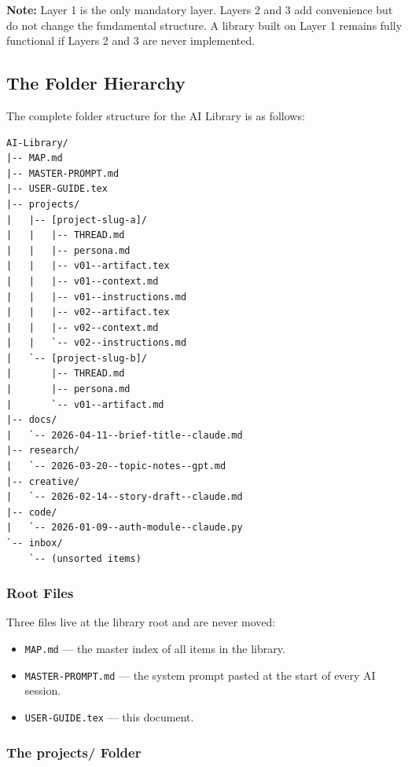 \documentclass[12pt,letterpaper]{article}
\begin{document}
\begin{mdframed}[style=notebox]
\textbf{Note:} Layer 1 is the only mandatory layer. Layers 2 and 3 add
convenience but do not change the fundamental structure. A library built on
Layer 1 remains fully functional if Layers 2 and 3 are never implemented.
\end{mdframed}

\subsection{The Folder Hierarchy}

The complete folder structure for the AI Library is as follows:

\begin{lstlisting}
AI-Library/
|-- MAP.md
|-- MASTER-PROMPT.md
|-- USER-GUIDE.tex
|-- projects/
|   |-- [project-slug-a]/
|   |   |-- THREAD.md
|   |   |-- persona.md
|   |   |-- v01--artifact.tex
|   |   |-- v01--context.md
|   |   |-- v01--instructions.md
|   |   |-- v02--artifact.tex
|   |   |-- v02--context.md
|   |   `-- v02--instructions.md
|   `-- [project-slug-b]/
|       |-- THREAD.md
|       |-- persona.md
|       `-- v01--artifact.md
|-- docs/
|   `-- 2026-04-11--brief-title--claude.md
|-- research/
|   `-- 2026-03-20--topic-notes--gpt.md
|-- creative/
|   `-- 2026-02-14--story-draft--claude.md
|-- code/
|   `-- 2026-01-09--auth-module--claude.py
`-- inbox/
    `-- (unsorted items)
\end{lstlisting}

\subsubsection{Root Files}

Three files live at the library root and are never moved:

\begin{itemize}
  \item \texttt{MAP.md} --- the master index of all items in the library.
  \item \texttt{MASTER-PROMPT.md} --- the system prompt pasted at the start
        of every AI session.
  \item \texttt{USER-GUIDE.tex} --- this document.
\end{itemize}

\subsubsection{The projects/ Folder}
\end{document}
